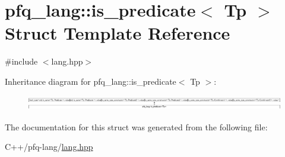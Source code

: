 \hypertarget{structpfq__lang_1_1is__predicate}{\section{pfq\+\_\+lang\+:\+:is\+\_\+predicate$<$ Tp $>$ Struct Template Reference}
\label{structpfq__lang_1_1is__predicate}
}


{\ttfamily \#include $<$lang.\+hpp$>$}

Inheritance diagram for pfq\+\_\+lang\+:\+:is\+\_\+predicate$<$ Tp $>$\+:\begin{figure}[H]
\begin{center}
\leavevmode
\includegraphics[height=0.645905cm]{structpfq__lang_1_1is__predicate}
\end{center}
\end{figure}


The documentation for this struct was generated from the following file\+:\begin{DoxyCompactItemize}
\item 
C++/pfq-\/lang/\hyperlink{lang_8hpp}{lang.\+hpp}\end{DoxyCompactItemize}

